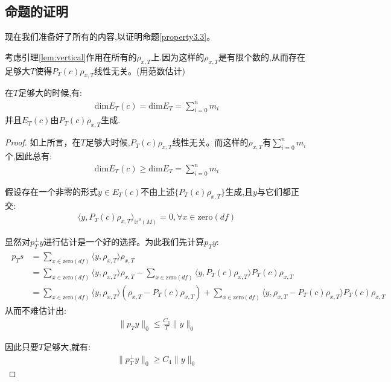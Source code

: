 \subsection{命题的证明}
现在我们准备好了所有的内容,以证明命题\ref{property3.3}。

考虑引理\ref{lem:vertical}作用在所有的$\rho_{x,T}$上.因为这样的$\rho_{x,T}$是有限个数的,从而存在足够大$T$使得$P_T(c)\rho_{x,T}$线性无关。(用范数估计)

\begin{proposition}
	在$T$足够大的时候,有:
	\begin{align}
\mathrm{dim}E_T(c)=\mathrm{dim}E_T=\sum_{i=0}^n m_i
	\end{align}
	并且$E_T(c)$由$P_T(c)\rho_{x,T}$生成.
\end{proposition}
\begin{proof}
	如上所言，在$T$足够大时候,$P_T(c)\rho_{x,T}$线性无关。而这样的$\rho_{x,T}$有$\displaystyle \sum_{i=0}^n m_i$个,因此总有:
	\begin{align}
		\mathrm{dim}E_T(c)\geq \mathrm{dim}E_T=\sum_{i=0}^n m_i
	\end{align}

	假设存在一个非零的形式$y \in E_T(c)$不由上述$\{P_T(c)\rho_{x,T}\}$生成,且$y$与它们都正交:
	\begin{align*}
		\langle y,P_T(c)\rho_{x,T}\rangle_{\mathbb{H}^0(M)}=0,\forall x \in \mathrm{zero}(df)
	\end{align*}
    
	显然对$p_T^{\perp}y$进行估计是一个好的选择。为此我们先计算$p_Ty$:
	\begin{align}
		\begin{split}
			p_Ts&=\sum_{x \in \mathrm{zero}(df)}\langle y,\rho_{x,T}\rangle\rho_{x,T}\\
			&=\sum_{x \in \mathrm{zero}(df)}\langle y,\rho_{x,T}\rangle\rho_{x,T}-\sum_{x\in \mathrm{zero}(df)}\langle y,P_T(c)\rho_{x,T}\rangle P_T(c)\rho_{x,T}\\
			&=\sum_{x\in \mathrm{zero}(df)}\langle y,\rho_{x,T}\rangle(\rho_{x,T}-P_T(c)\rho_{x,T})+\sum_{x\in \mathrm{zero}(df)}\langle y,\rho_{x,T}-P_T(c)\rho_{x,T}\rangle P_T(c)\rho_{x,T}
		\end{split}
	\end{align}
	从而不难估计出:
	\begin{align}
		\|p_Ty\|_0\leq \frac{C_3}{T}\|y\|_0
	\end{align}

    因此只要$T$足够大,就有:
	\begin{align}
		\|p_T^{\perp}y\|_0 \geq C_4\|y\|_0
	\end{align}
	

\end{proof}
